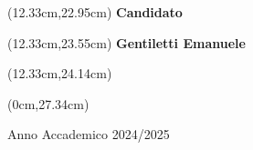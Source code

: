 \begin{textblock*}{8cm}(12.33cm,22.95cm)
	\noindent
	\textbf{Candidato}
\end{textblock*}
\begin{textblock*}{8cm}(12.33cm,23.55cm)
	\noindent	\textbf{Gentiletti Emanuele}
\end{textblock*}
\begin{textblock*}{8cm}(12.33cm,24.14cm)
\end{textblock*}

\begin{textblock*}{21cm}(0cm,27.34cm)
	\centerline{Anno Accademico 2024/2025}
\end{textblock*}

\endgroup

\newpage
$ $

\newpage
$ $

